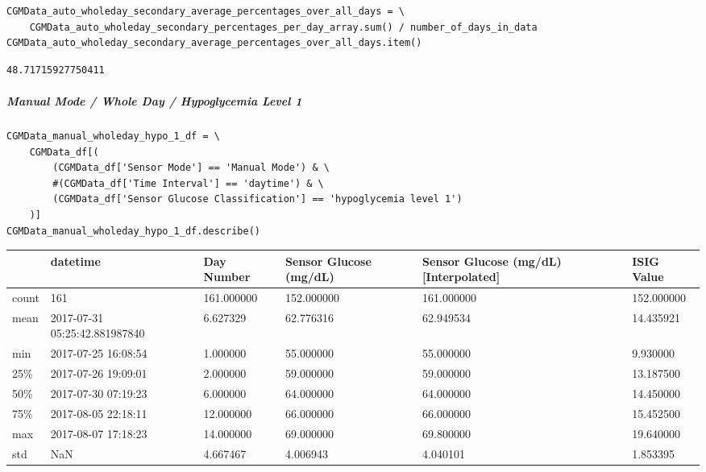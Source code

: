 \begin{verbatim}
CGMData_auto_wholeday_secondary_average_percentages_over_all_days = \
    CGMData_auto_wholeday_secondary_percentages_per_day_array.sum() / number_of_days_in_data
CGMData_auto_wholeday_secondary_average_percentages_over_all_days.item()
\end{verbatim}

\begin{verbatim}
48.71715927750411
\end{verbatim}

\subparagraph{Manual Mode / Whole Day / Hypoglycemia Level 1}

\begin{verbatim}
CGMData_manual_wholeday_hypo_1_df = \
    CGMData_df[(
        (CGMData_df['Sensor Mode'] == 'Manual Mode') & \
        #(CGMData_df['Time Interval'] == 'daytime') & \
        (CGMData_df['Sensor Glucose Classification'] == 'hypoglycemia level 1')
    )]
CGMData_manual_wholeday_hypo_1_df.describe()
\end{verbatim}

\bigskip\noindent
\begin{tabular}{p{}p{}p{}p{}p{}p{}}
\toprule
 & datetime & Day Number & Sensor Glucose (mg/dL) & Sensor Glucose (mg/dL) [Interpolated] & ISIG Value \\
\hline
count & 161 & 161.000000 & 152.000000 & 161.000000 & 152.000000 \\
\hline
mean & 2017-07-31 05:25:42.881987840 & 6.627329 & 62.776316 & 62.949534 & 14.435921 \\
\hline
min & 2017-07-25 16:08:54 & 1.000000 & 55.000000 & 55.000000 & 9.930000 \\
\hline
25\% & 2017-07-26 19:09:01 & 2.000000 & 59.000000 & 59.000000 & 13.187500 \\
\hline
50\% & 2017-07-30 07:19:23 & 6.000000 & 64.000000 & 64.000000 & 14.450000 \\
\hline
75\% & 2017-08-05 22:18:11 & 12.000000 & 66.000000 & 66.000000 & 15.452500 \\
\hline
max & 2017-08-07 17:18:23 & 14.000000 & 69.000000 & 69.800000 & 19.640000 \\
\hline
std & NaN & 4.667467 & 4.006943 & 4.040101 & 1.853395 \\
\hline
\bottomrule
\end{tabular}

